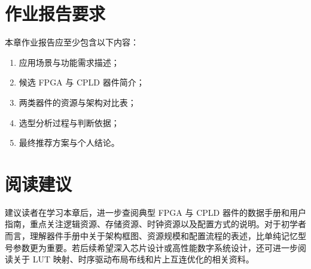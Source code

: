 \section{作业报告要求}\label{ux4f5cux4e1aux62a5ux544aux8981ux6c42}

本章作业报告应至少包含以下内容：

\begin{enumerate}
\def\labelenumi{\arabic{enumi}.}
\tightlist
\item
  应用场景与功能需求描述；
\item
  候选 FPGA 与 CPLD 器件简介；
\item
  两类器件的资源与架构对比表；
\item
  选型分析过程与判断依据；
\item
  最终推荐方案与个人结论。
\end{enumerate}

\section{阅读建议}\label{ux9605ux8bfbux5efaux8bae}

建议读者在学习本章后，进一步查阅典型 FPGA 与 CPLD
器件的数据手册和用户指南，重点关注逻辑资源、存储资源、时钟资源以及配置方式的说明。对于初学者而言，理解器件手册中关于架构框图、资源规模和配置流程的表述，比单纯记忆型号参数更为重要。若后续希望深入芯片设计或高性能数字系统设计，还可进一步阅读关于
LUT 映射、时序驱动布局布线和片上互连优化的相关资料。
